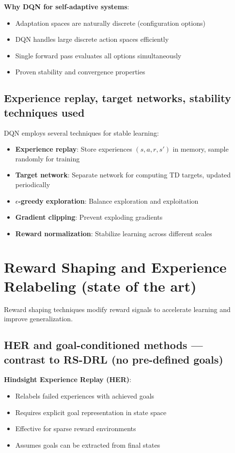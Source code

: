 \documentclass[11pt,a4paper]{article}
\begin{document}
\textbf{Why DQN for self-adaptive systems}:
\begin{itemize}
    \item Adaptation spaces are naturally discrete (configuration options)
    \item DQN handles large discrete action spaces efficiently
    \item Single forward pass evaluates all options simultaneously
    \item Proven stability and convergence properties
\end{itemize}

\subsection{Experience replay, target networks, stability techniques used}

DQN employs several techniques for stable learning:

\begin{itemize}
    \item \textbf{Experience replay}: Store experiences $(s,a,r,s')$ in memory, sample randomly for training
    \item \textbf{Target network}: Separate network for computing TD targets, updated periodically
    \item \textbf{$\epsilon$-greedy exploration}: Balance exploration and exploitation
    \item \textbf{Gradient clipping}: Prevent exploding gradients
    \item \textbf{Reward normalization}: Stabilize learning across different scales
\end{itemize}

\section{Reward Shaping and Experience Relabeling (state of the art)}

Reward shaping techniques modify reward signals to accelerate learning and improve generalization.

\subsection{HER and goal-conditioned methods --- contrast to RS-DRL (no pre-defined goals)}

\textbf{Hindsight Experience Replay (HER)}:
\begin{itemize}
    \item Relabels failed experiences with achieved goals
    \item Requires explicit goal representation in state space
    \item Effective for sparse reward environments
    \item Assumes goals can be extracted from final states
\end{itemize}
\end{document}
